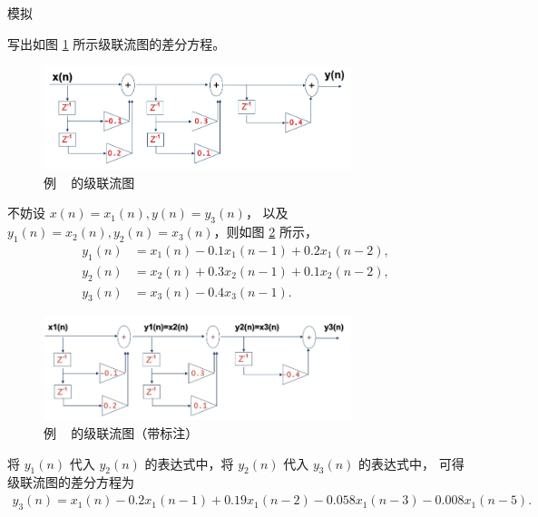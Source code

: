 \begin{definition}
    模拟
\end{definition}

\begin{example}
    \label{exercise:serial-flow-graph}
    写出如图 \ref{fig:serial-flow-graph} 所示级联流图的差分方程。
    \begin{figure}[H]
        \centering
        \includegraphics[width=0.8\textwidth]{chap4/img/serial_flow_graph.png}
        \caption{例 \theexample~ 的级联流图}
        \label{fig:serial-flow-graph}
    \end{figure}
\end{example}

\begin{solution}
    不妨设 $x(n) = x_1(n), y(n) = y_3(n)$，
    以及 $y_1(n) = x_2(n), y_2(n) = x_3(n)$，则如图 \ref{fig:serial-flow-graph-annotated} 所示，
    \begin{align*}
        y_1(n) & = x_1(n) - 0.1x_1(n - 1) + 0.2x_1(n - 2), \\
        y_2(n) & = x_2(n) + 0.3x_2(n - 1) + 0.1x_2(n - 2), \\
        y_3(n) & = x_3(n) - 0.4x_3(n - 1).
    \end{align*}
    \begin{figure}[H]
        \centering
        \includegraphics[width=0.8\textwidth]{chap4/img/serial_flow_graph_annotated.png}
        \caption{例 \theexample~ 的级联流图（带标注）}
        \label{fig:serial-flow-graph-annotated}
    \end{figure}
    将 $y_1(n)$ 代入 $y_2(n)$ 的表达式中，将 $y_2(n)$ 代入 $y_3(n)$ 的表达式中，
    可得级联流图的差分方程为
    \begin{align*}
        y_3(n) = x_1(n) - 0.2x_1(n - 1) + 0.19x_1(n - 2) - 0.058x_1(n - 3) - 0.008x_1(n - 5).
    \end{align*}
\end{solution}

